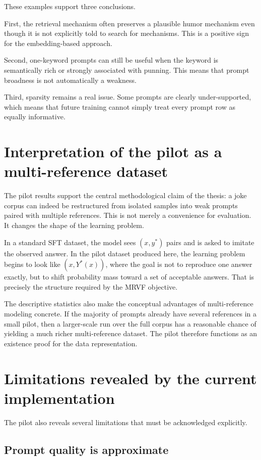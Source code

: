 \documentclass[14pt,a4paper]{extreport}
\begin{document}
These examples support three conclusions.

First, the retrieval mechanism often preserves a plausible humor mechanism even though it is not explicitly told to search for mechanisms. This is a positive sign for the embedding-based approach.

Second, one-keyword prompts can still be useful when the keyword is semantically rich or strongly associated with punning. This means that prompt broadness is not automatically a weakness.

Third, sparsity remains a real issue. Some prompts are clearly under-supported, which means that future training cannot simply treat every prompt row as equally informative.

\section{Interpretation of the pilot as a multi-reference dataset}

The pilot results support the central methodological claim of the thesis: a joke corpus can indeed be restructured from isolated samples into weak prompts paired with multiple references. This is not merely a convenience for evaluation. It changes the shape of the learning problem.

In a standard SFT dataset, the model sees \((x,y^{*})\) pairs and is asked to imitate the observed answer. In the pilot dataset produced here, the learning problem begins to look like \((x,Y^{*}(x))\), where the goal is not to reproduce one answer exactly, but to shift probability mass toward a set of acceptable answers. That is precisely the structure required by the MRVF objective.

The descriptive statistics also make the conceptual advantages of multi-reference modeling concrete. If the majority of prompts already have several references in a small pilot, then a larger-scale run over the full corpus has a reasonable chance of yielding a much richer multi-reference dataset. The pilot therefore functions as an existence proof for the data representation.

\section{Limitations revealed by the current implementation}

The pilot also reveals several limitations that must be acknowledged explicitly.

\subsection{Prompt quality is approximate}
\end{document}
